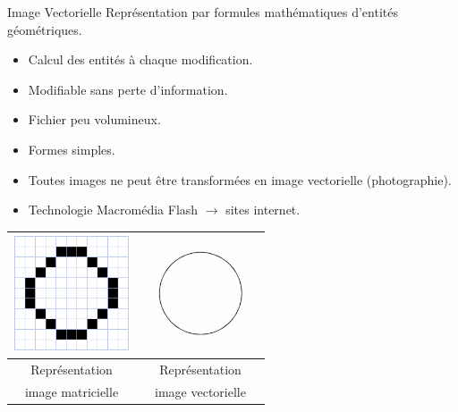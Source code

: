 \documentclass[14pt]{beamer}
\begin{document}
\begin{frame}
    \begin{block}{Image Vectorielle}
        Représentation par formules mathématiques d'entités géométriques.\\
    \end{block}
    \vfill
    \begin{itemize}
    \item Calcul des entités à chaque modification.
    \item Modifiable sans perte d'information.
    \item Fichier peu volumineux.
    \item Formes simples.
    \item Toutes images ne peut être transformées en image vectorielle (photographie).
    \item Technologie Macromédia Flash $\rightarrow$ sites internet.
    \end{itemize}
\end{frame}


\begin{frame}
    \begin{table}[h]
        \begin{tabular}{|c|c|}
            \hline
            \includegraphics[width=130px]{image_rond_mat}
            &  
            \includegraphics[width=130px]{image_rond_vect}\\
            \hline
            Représentation & Représentation\\
            image matricielle & image vectorielle\\
            \hline
        \end{tabular}
    \end{table}
\end{frame}
\end{document}
